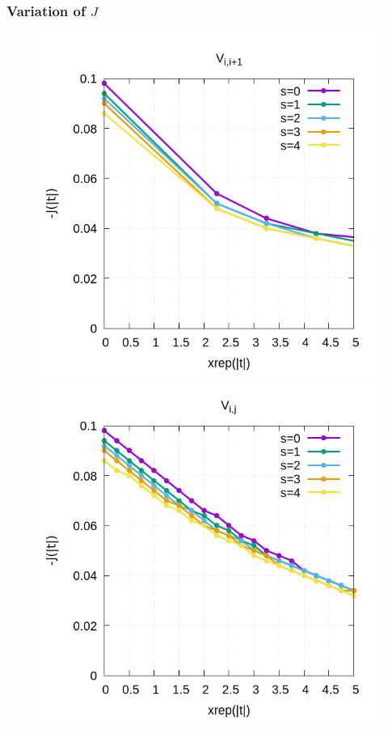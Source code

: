 \documentclass[ openright,titlepage,numbers=noenddot,headinclude,twoside,%
                footinclude=true,cleardoublepage=empty,abstractoff,%
                BCOR=5mm,paper=a4,fontsize=11pt,%
                ngerman,american,%
]{scrreprt}
\begin{document}
\subsubsection{Variation of $J$}
\begin{figure}[h!]
\centering
    \hspace{-2cm}
    \begin{minipage}{0.4\textwidth}
    \includegraphics[scale=0.4]{J_vs_xrepv1.png}
    \end{minipage}
    \hspace{2cm}
    \begin{minipage}{0.4\textwidth}
    \includegraphics[scale=0.4]{J_vs_xrepvn.png}

\end{minipage}
\end{figure}
\end{document}
